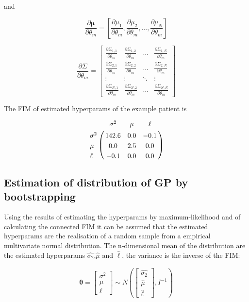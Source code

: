 	and
	
	\begin{displaymath}
		\frac{\partial \pmb{\mu}}{\partial \theta_{m}} =
		[ 
		\frac{\partial \mu_{1}}{\partial \theta_{m}},
		\frac{\partial \mu_{2}}{\partial \theta_{m}},
		\ldots,
		\frac{\partial \mu_{N}}{\partial \theta_{m}}
		]
	\end{displaymath}
	
	\begin{displaymath}
	\frac{\partial \Sigma}{\partial \theta_{m}} =
		\begin{bmatrix}
			\frac{ \partial \Sigma_{1,1}}{\partial \theta_{m}} &
			\frac{ \partial \Sigma_{1,2}}{\partial \theta_{m}} &
			\ldots &
			\frac{ \partial \Sigma_{1,N}}{\partial \theta_{m}} \\
			\frac{ \partial \Sigma_{2,1}}{\partial \theta_{m}} &
			\frac{ \partial \Sigma_{2,2}}{\partial \theta_{m}} &
			\ldots &
			\frac{ \partial \Sigma_{2,N}}{\partial \theta_{m}} \\
			\vdots &
			\vdots &
			\ddots &
			\vdots \\
			\frac{ \partial \Sigma_{N,1}}{\partial \theta_{m}} &
			\frac{ \partial \Sigma_{N,2}}{\partial \theta_{m}} &
			\ldots &
			\frac{ \partial \Sigma_{N,N}}{\partial \theta_{m}} 
		\end{bmatrix}
	\end{displaymath}
	 
	The \ac{FIM} of estimated hyperparams of the example patient is   
	
	\begin{align}
		\bordermatrix{
	 			& \sigma^{2} & \mu & \ell \cr
	 		\sigma^{2} & 142.6 & 0.0 & -0.1 \cr
	 		\mu & 0.0 & 2.5 & 0.0 \cr
	 		\ell & -0.1 & 0.0 & 0.0 \cr
		}
	\end{align}
	
	\subsection{Estimation of distribution of \ac{GP} by bootstrapping}
	Using the results of estimating the hyperparams by maximum-likelihood and of calculating the connected \ac{FIM} it can be assumed that the estimated hyperparams are the realisation of a random sample from a empirical multivariate normal distribution. The n-dimensional mean of the distribution are the estimated hyperparams $\hat{\sigma_{2}}$,$\hat{\mu}$ and $\hat{\ell}$, the variance is the inverse of the \ac{FIM}:
	
	\begin{align}
		\pmb{\theta} = 
		\begin{bmatrix}
			\sigma^{2} \\
			\mu \\
			\ell
		\end{bmatrix}
		\sim N(
			\begin{bmatrix}
				\hat{\sigma_{2}} \\ \hat{\mu} \\ \hat{\ell}
			\end{bmatrix}
		,
		I^{-1}
		) 
	\end{align}   
	
